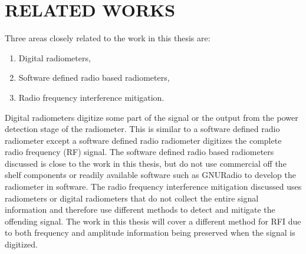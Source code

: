

\chapter{RELATED WORKS}\label{ch:relatedworks}

Three areas closely related to the work in this thesis are:

\begin{enumerate}
\item Digital radiometers,
\item Software defined radio based radiometers,
\item Radio frequency interference mitigation.
\end{enumerate} 

Digital radiometers digitize some part of the signal or the output from the power detection stage of the radiometer.    This is similar to a software defined radio radiometer except a software defined radio radiometer digitizes the complete radio frequency (RF) signal.  The software defined radio based radiometers discussed is close to the work in this thesis, but do not use commercial off the shelf components or readily available software such as GNURadio to develop the radiometer in software.  The radio frequency interference mitigation discussed uses radiometers or digital radiometers that do not collect the entire signal information and therefore use different methods to detect and mitigate the offending signal.  The work in this thesis will cover a different method for RFI due to both frequency and amplitude information being preserved when the signal is digitized.


